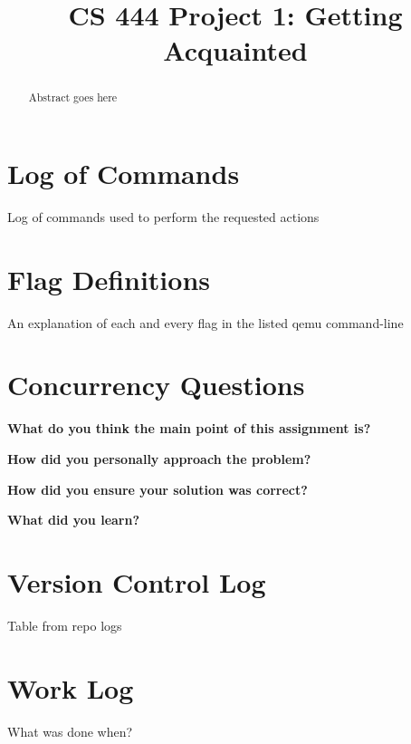 \documentclass[10pt,letterpaper,draftclsnofoot,onecolumn]{IEEEtran}
\begin{document}

\begin{titlepage}
\title{CS 444 Project 1: Getting Acquainted}
\author
{
}
    \maketitle
    \vspace{2cm}
    \begin{abstract}
        \noindent Abstract goes here
    \end{abstract}

\end{titlepage}

\section{Log of Commands}
\noindent Log of commands used to perform the requested actions

\section{Flag Definitions}
\noindent An explanation of each and every flag in the listed qemu command-line

\section{Concurrency Questions}
\noindent\textbf{What do you think the main point of this assignment is?}

\noindent\textbf{How did you personally approach the problem?}

\noindent\textbf{How did you ensure your solution was correct?}

\noindent\textbf{What did you learn?}

\section{Version Control Log}
\noindent Table from repo logs

\section{Work Log}
\noindent What was done when?
\end{document}
